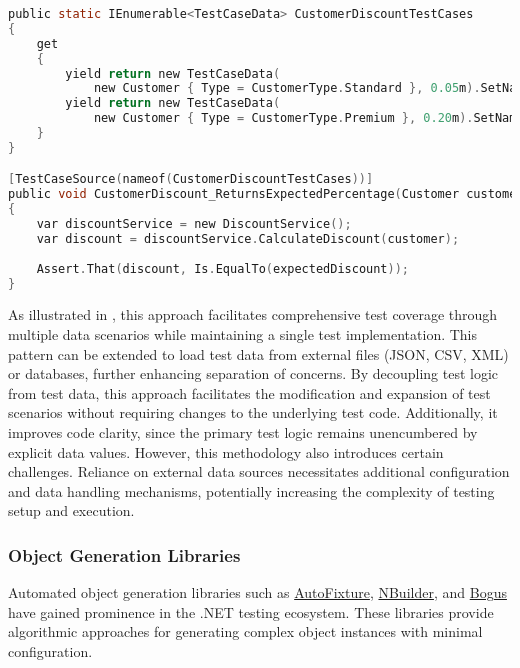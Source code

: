 \begin{lstlisting}[language=C, caption=External Data Sources,label={lst:external}]
public static IEnumerable<TestCaseData> CustomerDiscountTestCases
{
    get
    {
        yield return new TestCaseData(
            new Customer { Type = CustomerType.Standard }, 0.05m).SetName("StandardCustomer_Returns5Percent");
        yield return new TestCaseData(
            new Customer { Type = CustomerType.Premium }, 0.20m).SetName("PremiumCustomer_Returns20Percent");
    }
}

[TestCaseSource(nameof(CustomerDiscountTestCases))]
public void CustomerDiscount_ReturnsExpectedPercentage(Customer customer, decimal expectedDiscount)
{
    var discountService = new DiscountService();
    var discount = discountService.CalculateDiscount(customer);
    
    Assert.That(discount, Is.EqualTo(expectedDiscount));
}
\end{lstlisting}
As illustrated in , this approach facilitates comprehensive test coverage through multiple data scenarios while maintaining a single test implementation. This pattern can be extended to load test data from external files (JSON, CSV, XML) or databases, further enhancing separation of concerns. By decoupling test logic from test data, this approach facilitates the modification and expansion of test scenarios without requiring changes to the underlying test code. Additionally, it improves code clarity, since the primary test logic remains unencumbered by explicit data values. However, this methodology also introduces certain challenges. Reliance on external data sources necessitates additional configuration and data handling mechanisms, potentially increasing the complexity of testing setup and execution.

\subsubsection{Object Generation Libraries}

Automated object generation libraries such as \href{https://autofixture.github.io/}{AutoFixture}, \href{https://github.com/nbuilder/nbuilder}{NBuilder}, and \href{https://github.com/bchavez/Bogus}{Bogus} have gained prominence in the .NET testing ecosystem. These libraries provide algorithmic approaches for generating complex object instances with minimal configuration.

